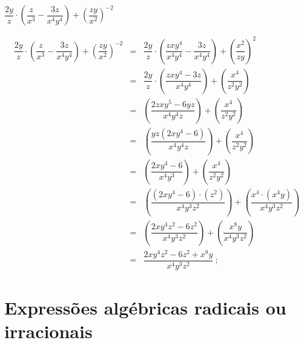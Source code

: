  \begin{exem}
  $\dfrac{2y}{z} \cdot \left( \dfrac{z}{x^3} - \dfrac{3z}{x^4y^4} \right) + \left( \dfrac{zy}{x^2} \right)^{-2}$
  
  \begin{eqnarray*}
   \dfrac{2y}{z} \cdot \left( \dfrac{z}{x^3} - \dfrac{3z}{x^4y^4} \right) + \left( \dfrac{zy}{x^2} \right)^{-2} 
   &=& \dfrac{2y}{z} \cdot \left( \dfrac{zxy^4}{x^4y^4} - \dfrac{3z}{x^4y^4} \right) + \left( \dfrac{x^2}{zy} \right)^{2} \\
   &=& \dfrac{2y}{z} \cdot \left( \dfrac{zxy^4 - 3z}{x^4y^4} \right) + \left( \dfrac{x^4}{z^2y^2} \right) \\
   &=& \left( \dfrac{2zxy^5 - 6yz}{x^4y^4z} \right) + \left( \dfrac{x^4}{z^2y^2} \right) \\
   &=& \left( \dfrac{yz(2xy^4 - 6)}{x^4y^4z} \right) + \left( \dfrac{x^4}{z^2y^2} \right) \\
   &=& \left( \dfrac{2xy^4 - 6}{x^4y^3} \right) + \left( \dfrac{x^4}{z^2y^2} \right) \\
   &=& \left( \dfrac{(2xy^4 - 6) \cdot (z^2)}{x^4y^3z^2} \right) + \left( \dfrac{x^4 \cdot (x^4y)}{x^4y^3z^2} \right) \\
   &=& \left( \dfrac{2xy^4z^2 - 6z^2}{x^4y^3z^2} \right) + \left( \dfrac{x^8y}{x^4y^3z^2} \right) \\
   &=& \dfrac{2xy^4z^2 - 6z^2 + x^8y}{x^4y^3z^2} \ ;
  \end{eqnarray*}
 \end{exem}

 

 \section{Expressões algébricas radicais ou irracionais}
 
